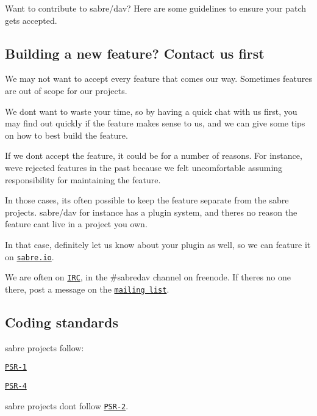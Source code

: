 Want to contribute to sabre/dav? Here are some guidelines to ensure your patch gets accepted.

\subsection*{Building a new feature? Contact us first }

We may not want to accept every feature that comes our way. Sometimes features are out of scope for our projects.

We don\textquotesingle{}t want to waste your time, so by having a quick chat with us first, you may find out quickly if the feature makes sense to us, and we can give some tips on how to best build the feature.

If we don\textquotesingle{}t accept the feature, it could be for a number of reasons. For instance, we\textquotesingle{}ve rejected features in the past because we felt uncomfortable assuming responsibility for maintaining the feature.

In those cases, it\textquotesingle{}s often possible to keep the feature separate from the sabre projects. sabre/dav for instance has a plugin system, and there\textquotesingle{}s no reason the feature can\textquotesingle{}t live in a project you own.

In that case, definitely let us know about your plugin as well, so we can feature it on \href{http://sabre.io/}{\tt sabre.\+io}.

We are often on \href{irc://freenode.net/#sabredav}{\tt I\+RC}, in the \#sabredav channel on freenode. If there\textquotesingle{}s no one there, post a message on the \href{http://groups.google.com/group/sabredav-discuss}{\tt mailing list}.

\subsection*{Coding standards }

sabre projects follow\+:


\begin{DoxyEnumerate}
\item \href{http://www.php-fig.org/psr/psr-1/}{\tt P\+S\+R-\/1}
\item \href{http://www.php-fig.org/psr/psr-4/}{\tt P\+S\+R-\/4}
\end{DoxyEnumerate}

sabre projects don\textquotesingle{}t follow \href{http://www.php-fig.org/psr/psr-2/}{\tt P\+S\+R-\/2}.

